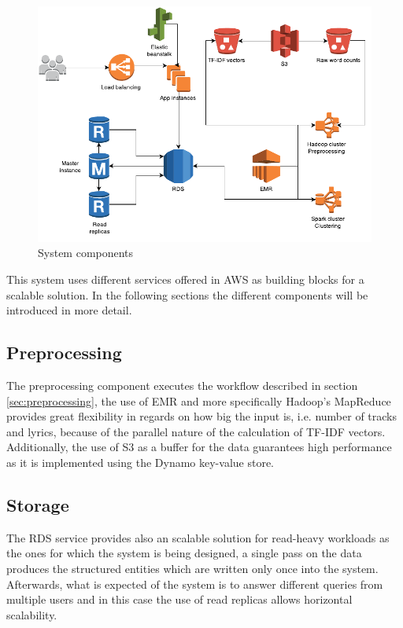 \documentclass[10pt,a4paper]{scrartcl}
\begin{document}
  \begin{figure}
    \centering
    \includegraphics[scale=0.8]{img/architecture}
    \caption{System components}
    \label{fig:architecture}
  \end{figure}          
      
  This system uses different services offered in AWS as building blocks for a
  scalable solution. In the following sections the different components will
  be introduced in more detail.
  
  \subsection{Preprocessing}

  The preprocessing component executes the workflow described in section
  \ref{sec:preprocessing}, the use of EMR and more specifically Hadoop's
  MapReduce provides great flexibility in regards on how big the input is, i.e.
  number of tracks and lyrics, because of the parallel nature of the
  calculation of TF-IDF vectors. Additionally, the use of S3 as a buffer for
  the data guarantees high performance as it is implemented using the Dynamo
  key-value store.
  
  \subsection{Storage}
  
  The RDS service provides also an scalable solution for read-heavy workloads
  as the ones for which the system is being designed, a single pass on the data
  produces the structured entities which are written only once into the system.
  Afterwards, what is expected of the system is to answer different queries from
  multiple users and in this case the use of read replicas allows horizontal
  scalability.
  
\end{document}
